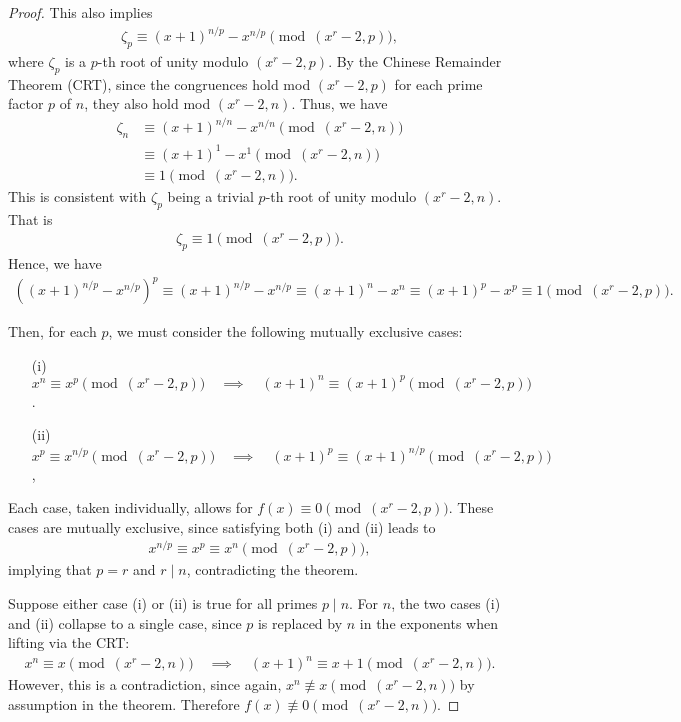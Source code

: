 \documentclass{article}
\theoremstyle{plain}
\theoremstyle{definition}
\begin{document}
\begin{proof}
This also implies
\begin{align*}
    \zeta_p \equiv (x+1)^{n/p} - x^{n/p} \pmod{(x^r-2, p)} ,
\end{align*}
where $\zeta_p$ is a $p$-th root of unity modulo $(x^r-2, p)$. By the Chinese Remainder Theorem (CRT), since the congruences hold mod $(x^r-2, p)$ for each prime factor $p$ of $n$, they also hold mod $(x^r-2, n)$. Thus, we have
\begin{align*}
\zeta_n &\equiv (x+1)^{n/n} - x^{n/n} \pmod{(x^r-2, n)} \\
&\equiv (x+1)^1 - x^1 \pmod{(x^r-2, n)} \\
&\equiv 1 \pmod{(x^r-2, n)} .
\end{align*}
This is consistent with $\zeta_p$ being a trivial $p$-th root of unity modulo $(x^r-2, n)$. That is
\begin{align*}
\zeta_p \equiv 1 \pmod{(x^r-2, p)} .
\end{align*}
Hence, we have
\begin{align*}
\left( (x+1)^{n/p} - x^{n/p} \right)^p \equiv (x+1)^{n/p} - x^{n/p} \equiv (x+1)^n - x^n \equiv (x+1)^p - x^p \equiv 1 \pmod{(x^r-2, p)} .
\end{align*}

Then, for each $p$, we must consider the following mutually exclusive cases:
\begin{enumerate}
\item[(i)] $x^n \equiv x^p \pmod{(x^r-2, p)} \quad\implies\quad (x+1)^n \equiv (x+1)^p \pmod{(x^r-2, p)}$.
\item[(ii)] $x^p \equiv x^{n/p} \pmod{(x^r-2, p)} \quad\implies\quad (x+1)^p \equiv (x+1)^{n/p} \pmod{(x^r-2, p)}$,
\end{enumerate}
Each case, taken individually, allows for $f(x) \equiv 0 \pmod{(x^r-2,p)}$. These cases are mutually exclusive, since satisfying both (i) and (ii) leads to
\begin{align*}
    x^{n/p} \equiv x^p \equiv x^n \pmod{(x^r-2, p)} ,
\end{align*}
implying that $p=r$ and $r \mid n$, contradicting the theorem.

Suppose either case (i) or (ii) is true for all primes $p \mid n$. For $n$, the two cases (i) and (ii) collapse to a single case, since $p$ is replaced by $n$ in the exponents when lifting via the CRT:
\begin{align*}
x^n \equiv x \pmod{(x^r-2, n)}
\quad\implies\quad
(x+1)^n \equiv x+1 \pmod{(x^r-2, n)} .
\end{align*}
However, this is a contradiction, since again, $x^n \not\equiv x \pmod{(x^r-2, n)}$ by assumption in the theorem. Therefore $f(x) \not\equiv 0 \pmod{(x^r-2, n)}$.


\end{proof}
\end{document}
